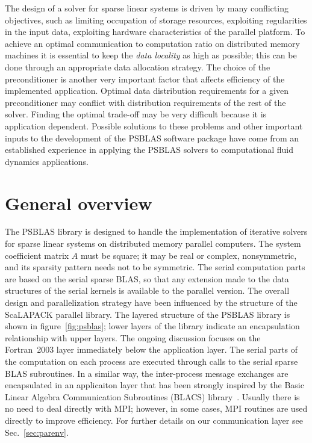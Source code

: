 The design of a solver for sparse linear systems is driven by many
conflicting objectives, such as limiting occupation of storage
resources, exploiting regularities in the input data, exploiting
hardware characteristics of the parallel platform.  To achieve an
optimal communication to computation ratio on distributed memory
machines it is essential to keep the {\em data locality} as high as
possible; this can be done through an appropriate data allocation
strategy.  The choice of the preconditioner is another very important
factor that affects efficiency of the implemented application. Optimal
data distribution requirements for a given preconditioner may conflict
with distribution requirements of the rest of the solver. Finding the
optimal trade-off may be very difficult because it is application
dependent.  Possible solutions to these problems and other important
inputs to the development of the PSBLAS software package have come from
an established experience in applying the PSBLAS solvers to
computational fluid dynamics applications.

\section{General overview}
\label{sec:overview} 
The PSBLAS library is designed to handle the implementation of
iterative solvers for sparse linear systems on distributed memory
parallel computers.  The system coefficient matrix $A$ must be square;
it may be real or complex, nonsymmetric, and its sparsity pattern
needs not to be symmetric.  The serial computation parts are based on
the serial sparse BLAS, so that any extension made to the data
structures of the serial kernels is available to the parallel
version. The overall design and parallelization strategy have been
influenced by the structure of the ScaLAPACK parallel
library.  The layered structure of the PSBLAS library
is shown in figure~\ref{fig:psblas}; lower layers of the library
indicate an encapsulation relationship with upper layers. The ongoing
discussion focuses on the Fortran~2003 layer immediately below the
application layer.
The serial parts of the computation on each process are executed through
calls to the serial sparse BLAS subroutines. 
In a similar way, the inter-process message exchanges are encapsulated
in an applicaiton layer that has been strongly inspired by the  Basic
Linear Algebra Communication Subroutines (BLACS) library~\cite{BLACS}.  
Usually  there is no need to deal directly with MPI;  however, in some
cases, MPI routines are used directly to improve efficiency. For
further details on our communication layer see Sec.~\ref{sec:parenv}.

